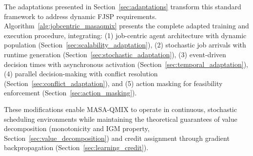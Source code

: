 The adaptations presented in Section~\ref{sec:adaptations} transform this standard framework to address dynamic FJSP requirements. Algorithm~\ref{alg:jobcentric_masaqmix} presents the complete adapted training and execution procedure, integrating: (1) job-centric agent architecture with dynamic population (Section~\ref{sec:scalability_adaptation}), (2) stochastic job arrivals with runtime generation (Section~\ref{sec:stochastic_adaptation}), (3) event-driven decision times with asynchronous activation (Section~\ref{sec:temporal_adaptation}), (4) parallel decision-making with conflict resolution (Section~\ref{sec:conflict_adaptation}), and (5) action masking for feasibility enforcement (Section~\ref{sec:action_masking}).

These modifications enable MASA-QMIX to operate in continuous, stochastic scheduling environments while maintaining the theoretical guarantees of value decomposition (monotonicity and IGM property, Section~\ref{sec:value_decomposition}) and credit assignment through gradient backpropagation (Section~\ref{sec:learning_credit}).

